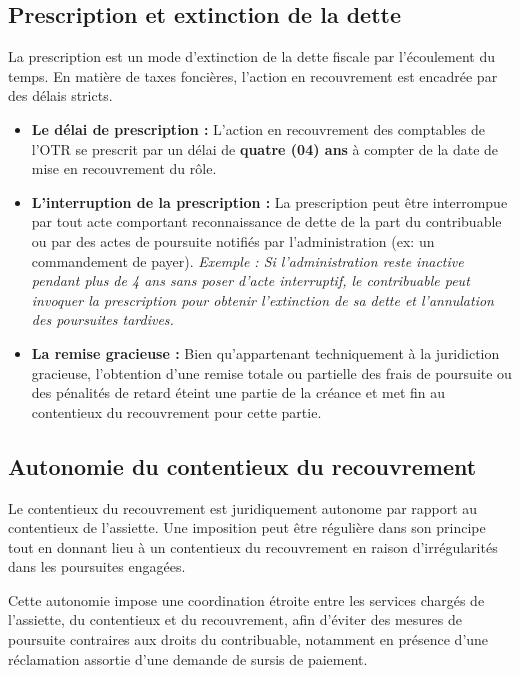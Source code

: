 \documentclass[Cours_contentieuxTF2026.tex]{subfiles}
\begin{document}
\subsection{Prescription et extinction de la dette}
La prescription est un mode d'extinction de la dette fiscale par l'écoulement du temps. En matière de taxes foncières, l'action en recouvrement est encadrée par des délais stricts.

\begin{itemize}
	\item \textbf{Le délai de prescription :} L'action en recouvrement des comptables de l'OTR se prescrit par un délai de \textbf{quatre (04) ans} à compter de la date de mise en recouvrement du rôle.
	
	\item \textbf{L'interruption de la prescription :} La prescription peut être interrompue par tout acte comportant reconnaissance de dette de la part du contribuable ou par des actes de poursuite notifiés par l'administration (ex: un commandement de payer).
	\textit{Exemple : Si l'administration reste inactive pendant plus de 4 ans sans poser d'acte interruptif, le contribuable peut invoquer la prescription pour obtenir l'extinction de sa dette et l'annulation des poursuites tardives.}
	
	\item \textbf{La remise gracieuse :} Bien qu'appartenant techniquement à la juridiction gracieuse, l'obtention d'une remise totale ou partielle des frais de poursuite ou des pénalités de retard éteint une partie de la créance et met fin au contentieux du recouvrement pour cette partie.
\end{itemize}

\subsection{Autonomie du contentieux du recouvrement}

Le contentieux du recouvrement est juridiquement autonome par rapport au
contentieux de l’assiette. Une imposition peut être régulière dans son principe tout en
donnant lieu à un contentieux du recouvrement en raison d’irrégularités dans les
poursuites engagées.

Cette autonomie impose une coordination étroite entre les services chargés de
l’assiette, du contentieux et du recouvrement, afin d’éviter des mesures de poursuite
contraires aux droits du contribuable, notamment en présence d’une réclamation
assortie d’une demande de sursis de paiement.
\end{document}
